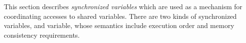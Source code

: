 This section describes {\em synchronized variables} which are used as
a mechanism for coordinating accesses to shared variables. There are
two kinds of synchronized variables,  and 
variable, whose semantics include execution order and memory
consistency requirements.


